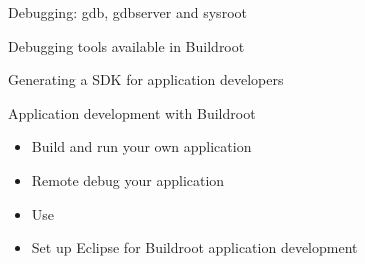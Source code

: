 \begin{frame}{Debugging: gdb, gdbserver and sysroot}

\end{frame}

\begin{frame}{Debugging tools available in Buildroot}

\end{frame}

\begin{frame}{Generating a SDK for application developers}

\end{frame}

\setuplabframe
{Application development with Buildroot}
{
  \begin{itemize}
  \item Build and run your own application
  \item Remote debug your application
  \item Use 
  \item Set up Eclipse for Buildroot application development
  \end{itemize}
}
